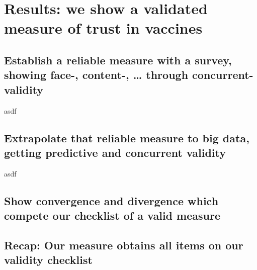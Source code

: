\chapter{Results: we show a validated measure of trust in vaccines}\label{chap:results}

\section{Establish a reliable measure with a survey, showing face-, content-, … through concurrent- validity}
asdf
\section{Extrapolate that reliable measure to big data, getting predictive and concurrent validity}
asdf
\section{Show convergence and divergence which compete our checklist of a valid measure}
\section{Recap: Our measure obtains all items on our validity checklist}

